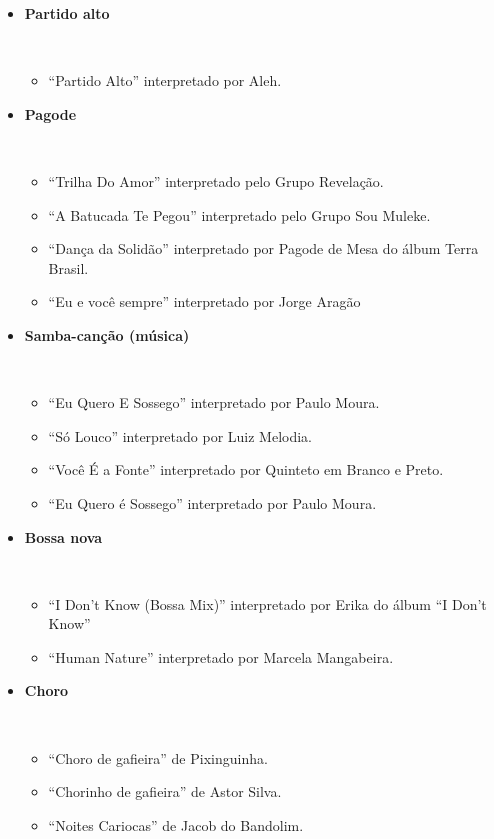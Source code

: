 \begin{itemize}
\item \textbf{Partido alto}
\begin{example} ~
\begin{itemize}
\item ``Partido Alto'' interpretado por Aleh.
\end{itemize}
\end{example} 

\item \textbf{Pagode}
\begin{example} ~
\begin{itemize}
\item ``Trilha Do Amor''  interpretado pelo Grupo Revelação. 
\item ``A Batucada Te Pegou'' interpretado pelo Grupo Sou Muleke.
\item ``Dança da Solidão'' interpretado por Pagode de Mesa do álbum Terra Brasil. 
\item ``Eu e você sempre'' interpretado por Jorge Aragão
\end{itemize}
\end{example} 

\item \textbf{Samba-canção (música)}
\begin{example} ~
\begin{itemize}
\item ``Eu Quero E Sossego'' interpretado por Paulo Moura.
\item ``Só Louco'' interpretado por Luiz Melodia.
\item ``Você É a Fonte'' interpretado por  Quinteto em Branco e Preto.
\item ``Eu Quero é Sossego'' interpretado por Paulo Moura.
\end{itemize}
\end{example} 

\item \textbf{Bossa nova}
\begin{example} ~
\begin{itemize}
\item ``I Don't Know (Bossa Mix)'' interpretado por Erika do álbum ``I Don't Know''
\item ``Human Nature'' interpretado por Marcela Mangabeira.
\end{itemize}
\end{example} 


\item \textbf{Choro}
\begin{example} ~
\begin{itemize}
\item ``Choro de gafieira'' de Pixinguinha.
\item ``Chorinho de gafieira'' de Astor Silva.
\item ``Noites Cariocas'' de Jacob do Bandolim.
\end{itemize}
\end{example} 



\end{itemize}
